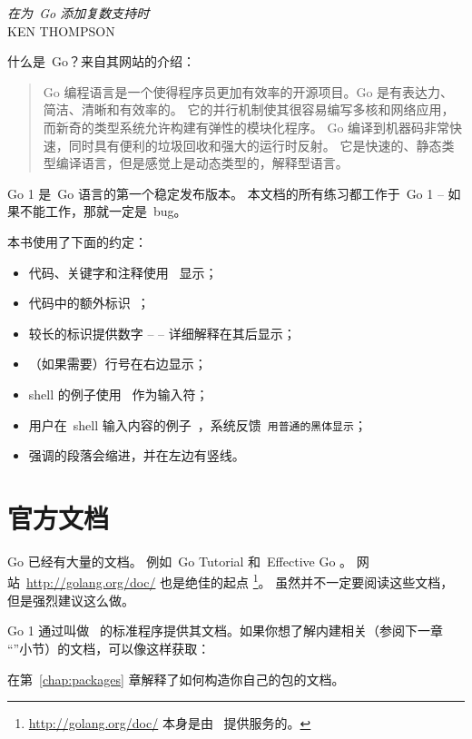 {\textit{在为~Go 添加复数支持时}\\ \textsc{KEN THOMPSON}}

\noindent{}什么是~Go？来自其网站\cite{go_web}的介绍：
\begin{quote}
Go 编程语言是一个使得程序员更加有效率的开源项目。Go 是有表达力、简洁、清晰和有效率的。
它的并行机制使其很容易编写多核和网络应用，而新奇的类型系统允许构建有弹性的模块化程序。
Go 编译到机器码非常快速，同时具有便利的垃圾回收和强大的运行时反射。
它是快速的、静态类型编译语言，但是感觉上是动态类型的，解释型语言。
\end{quote}

Go 1 是~Go 语言的第一个稳定发布版本。
本文档的所有练习都工作于~Go 1 -- 如果不能工作，那就一定是~bug。

本书使用了下面的约定：
\begin{itemize}
\item 代码、关键字和注释使用~ 显示；
\item 代码中的额外标识~；
\item 较长的标识提供数字 --  -- 详细解释在其后显示；
\item （如果需要）行号在右边显示；
\item shell 的例子使用~\pr{} 作为输入符；
\item 用户在~shell 输入内容的例子~\texttt{}，系统反馈~\texttt{用普通的黑体显示}；
\item 强调的段落会缩进，并在左边有竖线。
\end{itemize}

\section{官方文档}
Go 已经有大量的文档。
例如~Go Tutorial \cite{go_tutorial} 和~Effective Go \cite{effective_go}。
网站~\url{http://golang.org/doc/} 也是绝佳的起点 
\footnote{\url{http://golang.org/doc/} 本身是由~ 提供服务的。}。
虽然并不一定要阅读这些文档，但是强烈建议这么做。

Go 1 通过叫做~
的标准程序提供其文档。如果你想了解内建相关（参阅下一章
``''小节）的文档，可以像这样获取：
\begin{display}
\pr {}
\end{display}

在第~\ref{chap:packages} 章解释了如何构造你自己的包的文档。

